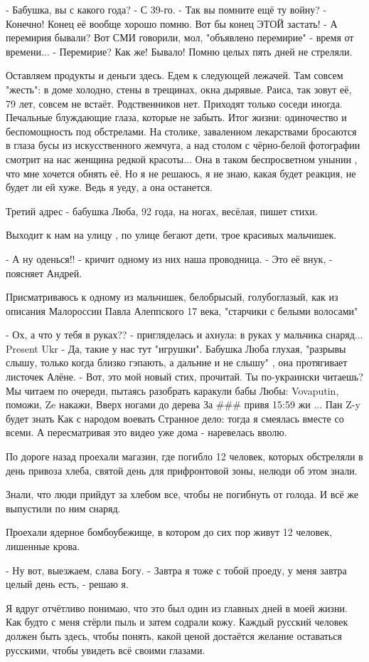 - Бабушка, вы с какого года?
- С 39-го.
- Так вы помните ещё ту войну?
- Конечно! Конец её вообще хорошо помню. Вот бы конец ЭТОЙ застать!
- А перемирия бывали? Вот СМИ говорили, мол, "объявлено перемирие" - время от времени...
- Перемирие? Как же! Бывало! Помню целых пять дней не стреляли.

Оставляем продукты и деньги здесь. Едем к следующей лежачей. Там совсем
"жесть": в доме холодно, стены в трещинах, окна дырявые. Раиса, так зовут её,
79 лет, совсем не встаёт. Родственников нет. Приходят только соседи иногда.
Печальные блуждающие глаза, которые не забыть. Итог жизни: одиночество и
беспомощность под обстрелами. На столике, заваленном лекарствами бросаются в
глаза бусы из искусственного жемчуга, а над столом с чёрно-белой фотографии
смотрит на нас женщина редкой красоты... Она в таком беспросветном унынии , что
мне хочется обнять её. Но я не решаюсь, я не знаю, какая будет реакция, не
будет ли ей хуже. Ведь я уеду, а она останется.

Третий адрес - бабушка Люба, 92 года, на ногах, весёлая, пишет стихи.

Выходит к нам на улицу , по улице бегают дети, трое красивых мальчишек.

- А ну оденься!! - кричит одному из них наша проводница.
- Это её внук, - поясняет Андрей.

Присматриваюсь к одному из мальчишек, белобрысый, голубоглазый, как из описания
Малороссии Павла Алеппского 17 века, "старчики с белыми волосами"

- Ох, а что у тебя в руках?? - пригляделась и ахнула: в руках у мальчика снаряд... Present Ukr
- Да, такие у нас тут "игрушки".
Бабушка Люба глухая, "разрывы слышу, только когда близко гэпають, а дальние и не слышу" , она протягивает листочек Алёне.
- Вот, это мой новый стих, прочитай. Ты по-украински читаешь?
Мы читаем по очереди, пытаясь разобрать каракули бабы Любы:
Vovaputin, поможи,
Ze накажи,
Вверх ногами до дерева
За \#\#\# привя
15:59
жи
...
Пан Z-y будет знать
Как с народом воевать
Странное дело: тогда я смеялась вместе со всеми. А пересматривая это видео уже дома - наревелась вволю.

По дороге назад проехали магазин, где погибло 12 человек, которых обстреляли в
день привоза хлеба, святой день для прифронтовой зоны, нелюди об этом знали.

Знали, что люди прийдут за хлебом все, чтобы не погибнуть от голода. И всё же
выпустили по ним снаряд.

Проехали ядерное бомбоубежище, в котором до сих пор живут 12 человек, лишенные крова.

- Ну вот, выезжаем, слава Богу.
- Завтра я тоже с тобой проеду, у меня завтра целый день есть, - решаю я.

Я вдруг отчётливо понимаю, что это был один из главных дней в моей жизни. Как
будто с меня стёрли пыль и затем содрали кожу. Каждый русский человек должен
быть здесь, чтобы понять, какой ценой достаётся желание оставаться русскими,
чтобы увидеть всё своими глазами.
